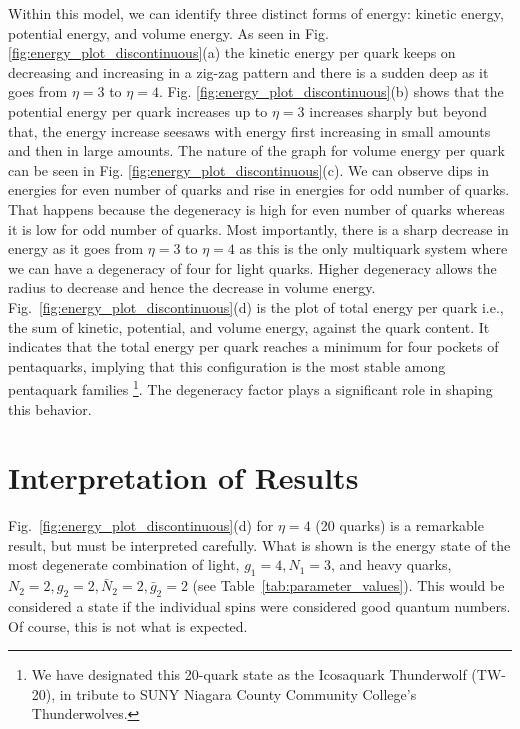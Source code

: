 \documentclass[final,3p,times,twocolumn]{elsarticle}
\begin{document}
    \begingroup
       \renewcommand{\thefootnote}{\fnsymbol{footnote}}
        Within this model, we can identify three distinct forms of energy: kinetic energy, potential energy, and volume energy. As seen in Fig. \ref{fig:energy_plot_discontinuous}(a) the kinetic energy per quark keeps on decreasing and increasing in a zig-zag pattern and there is a sudden deep as it goes from $\eta=3$ to $\eta=4$. Fig. \ref{fig:energy_plot_discontinuous}(b) shows that the potential energy per quark increases up to $\eta=3$ increases sharply but beyond that, the energy increase seesaws with energy first increasing in small amounts and then in large amounts. The nature of the graph for volume energy per quark can be seen in Fig. \ref{fig:energy_plot_discontinuous}(c). We can observe dips in energies for even number of quarks and rise in energies for odd number of quarks. That happens because the degeneracy is high for even number of quarks whereas it is low for odd number of quarks. Most importantly, there is a sharp decrease in energy as it goes from $\eta=3$ to $\eta=4$ as this is the only multiquark system where we can have a degeneracy of four for light quarks. Higher degeneracy allows the radius to decrease and hence the decrease in volume energy.  
        Fig.~\ref{fig:energy_plot_discontinuous}(d) is the plot of total energy per quark i.e., the sum of kinetic, potential, and volume energy, against the quark content.
        It indicates that the total energy per quark reaches a minimum for four pockets of pentaquarks, implying that this configuration is the most stable among pentaquark families \footnote[1]{We have designated this 20-quark state as the Icosaquark Thunderwolf (TW-20), in tribute to SUNY Niagara County Community College’s Thunderwolves.}. The degeneracy factor plays a significant role in shaping this behavior. 
    \endgroup
            
\section{Interpretation of Results}
    Fig.~\ref{fig:energy_plot_discontinuous}(d) for $\eta=4$ (20 quarks) is a remarkable result, but must be interpreted carefully. What is shown is the energy state of the most degenerate combination of light, $g_1=4, N_1=3$, and heavy quarks, $N_2=2,g_2=2,\bar{N}_2=2,\bar{g}_2=2$ (see Table~\ref{tab:parameter_values}). This would be considered a state if the individual spins were considered good quantum numbers. Of course, this is not what is expected.
    
\end{document}
